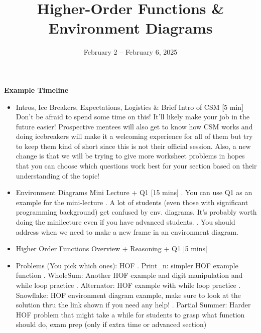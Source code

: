 \documentclass{exam}
\title{Higher-Order Functions \& Environment Diagrams}
\date{February 2 -- February 6, 2025}
\begin{document}
\maketitle

\begin{meta}
    \textbf{Example Timeline}
    \begin{itemize}
        \item Intros, Ice Breakers, Expectations, Logistics \& Brief Intro of CSM [5 min]
        \subitem Don't be afraid to spend some time on this! It'll likely make your job in the future easier! 
        Prospective mentees will also get to know how CSM works and doing icebreakers will make it a welcoming experience for all of them but try to keep them kind of short since this is not their official session.
        \subitem Also, a new change is that we will be trying to give more worksheet problems in hopes that you can choose which questions work best for your section based on their understanding of the topic!
        \item Environment Diagrams Mini Lecture + Q1 [15 mins]
        . You can use Q1 as an example for the mini-lecture
        . A lot of students (even those with significant programming background) get confused by env. diagrams. 
        It's probably worth doing the minilecture even if you have advanced students.
        . You should address when we need to make a new frame in an environment diagram.
        \item Higher Order Functions Overview + Reasoning + Q1 [5 mins]
        \item Problems (You pick which ones): HOF  
        . Print_n: simpler HOF example function
        . WholeSum: Another HOF example and digit manipulation and while loop practice
        . Alternator: HOF example with while loop practice
        . Snowflake: HOF environment diagram example, make sure to look at the solution thru the link shown if you need any help! 
        . Partial Summer: Harder HOF problem that might take a while for students to grasp what function should do, exam prep (only if extra time or advanced section)
    \end{itemize}
\end{meta} 
\end{document}
